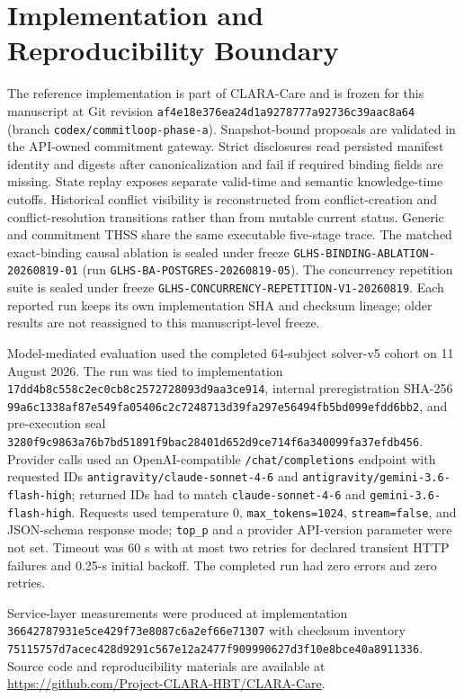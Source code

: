 \documentclass[11pt]{article}
\begin{document}
\section{Implementation and Reproducibility Boundary}
The reference implementation is part of CLARA-Care and is frozen for this manuscript at Git revision \nolinkurl{af4e18e376ea24d1a9278777a92736c39aac8a64} (branch \texttt{codex/commitloop-phase-a}). Snapshot-bound proposals are validated in the API-owned commitment gateway. Strict disclosures read persisted manifest identity and digests after canonicalization and fail if required binding fields are missing. State replay exposes separate valid-time and semantic knowledge-time cutoffs. Historical conflict visibility is reconstructed from conflict-creation and conflict-resolution transitions rather than from mutable current status. Generic and commitment THSS share the same executable five-stage trace. The matched exact-binding causal ablation is sealed under freeze \nolinkurl{GLHS-BINDING-ABLATION-20260819-01} (run \nolinkurl{GLHS-BA-POSTGRES-20260819-05}). The concurrency repetition suite is sealed under freeze \nolinkurl{GLHS-CONCURRENCY-REPETITION-V1-20260819}. Each reported run keeps its own implementation SHA and checksum lineage; older results are not reassigned to this manuscript-level freeze.

Model-mediated evaluation used the completed 64-subject solver-v5 cohort on 11 August 2026. The run was tied to implementation \nolinkurl{17dd4b8c558c2ec0cb8c2572728093d9aa3ce914}, internal preregistration SHA-256 \nolinkurl{99a6c1338af87e549fa05406c2c7248713d39fa297e56494fb5bd099efdd6bb2}, and pre-execution seal \nolinkurl{3280f9c9863a76b7bd51891f9bac28401d652d9ce714f6a340099fa37efdb456}. Provider calls used an OpenAI-compatible \texttt{/chat/completions} endpoint with requested IDs \texttt{antigravity/claude-sonnet-4-6} and \texttt{antigravity/gemini-3.6-flash-high}; returned IDs had to match \texttt{claude-sonnet-4-6} and \texttt{gemini-3.6-flash-high}. Requests used temperature 0, \texttt{max\_tokens=1024}, \texttt{stream=false}, and JSON-schema response mode; \texttt{top\_p} and a provider API-version parameter were not set. Timeout was 60 s with at most two retries for declared transient HTTP failures and 0.25-s initial backoff. The completed run had zero errors and zero retries.

Service-layer measurements were produced at implementation \nolinkurl{36642787931e5ce429f73e8087c6a2ef66e71307} with checksum inventory \nolinkurl{75115757d7acec428d9291c567e12a2477f909990627d3f10e8bce40a8911336}. Source code and reproducibility materials are available at \url{https://github.com/Project-CLARA-HBT/CLARA-Care}.
\end{document}
